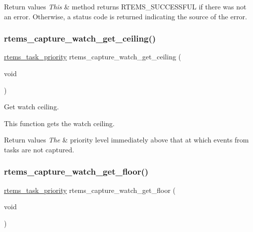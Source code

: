 \begin{DoxyRetVals}{Return values}
{\em This} & method returns R\+T\+E\+M\+S\+\_\+\+S\+U\+C\+C\+E\+S\+S\+F\+UL if there was not an error. Otherwise, a status code is returned indicating the source of the error. \\
\hline
\end{DoxyRetVals}
\mbox{\label{group__libmisc__capture_ga0d4e2c36e113e9413bd1aacdfe6edfb9}} 
\subsubsection{\texorpdfstring{rtems\_capture\_watch\_get\_ceiling()}{rtems\_capture\_watch\_get\_ceiling()}}
{\footnotesize\ttfamily \mbox{\hyperlink{group__ClassicTasks_gaa80a0c0938307d1e99d0eb5fee765b47}{rtems\+\_\+task\+\_\+priority}} rtems\+\_\+capture\+\_\+watch\+\_\+get\+\_\+ceiling (\begin{DoxyParamCaption}\item[{void}]{ }\end{DoxyParamCaption})}



Get watch ceiling. 

This function gets the watch ceiling.


\begin{DoxyRetVals}{Return values}
{\em The} & priority level immediately above that at which events from tasks are not captured. \\
\hline
\end{DoxyRetVals}
\mbox{\label{group__libmisc__capture_ga00a3676efcb328e7de776bcd01f60ee2}} 
\subsubsection{\texorpdfstring{rtems\_capture\_watch\_get\_floor()}{rtems\_capture\_watch\_get\_floor()}}
{\footnotesize\ttfamily \mbox{\hyperlink{group__ClassicTasks_gaa80a0c0938307d1e99d0eb5fee765b47}{rtems\+\_\+task\+\_\+priority}} rtems\+\_\+capture\+\_\+watch\+\_\+get\+\_\+floor (\begin{DoxyParamCaption}\item[{void}]{ }\end{DoxyParamCaption})}



